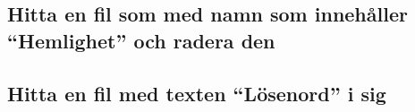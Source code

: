 \hypertarget{hitta-en-fil-som-med-namn-som-innehuxe5ller-hemlighet-och-radera-den}{%
\subsection{Hitta en fil som med namn som innehåller ``Hemlighet'' och
radera
den}\label{hitta-en-fil-som-med-namn-som-innehuxe5ller-hemlighet-och-radera-den}}

\hypertarget{cb18}{}
\begin{Shaded}
\begin{Highlighting}[]
\OperatorTok{=}  \OperatorTok{(}\OperatorTok{);}
\OperatorTok{(}\OperatorTok{())\{}
    \OperatorTok{[]}\OperatorTok{=}\OperatorTok{();}
    \OperatorTok{(}\OperatorTok{:}\OperatorTok{)\{}
        \OperatorTok{(}\OperatorTok{(}\OperatorTok{))\{}
\OperatorTok{();}
        \OperatorTok{\}}
    \OperatorTok{\}}
\OperatorTok{\}}
\end{Highlighting}
\end{Shaded}

\hypertarget{hitta-en-fil-med-texten-luxf6senord-i-sig}{%
\subsection{Hitta en fil med texten ``Lösenord'' i
sig}\label{hitta-en-fil-med-texten-luxf6senord-i-sig}}

